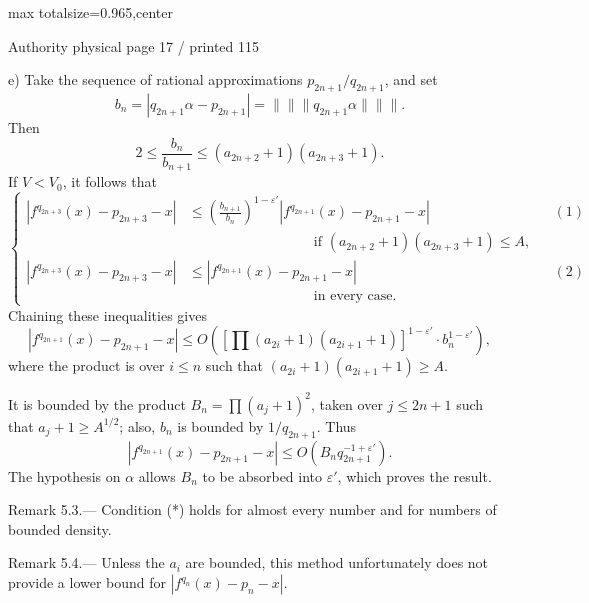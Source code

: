\documentclass{article}
\begin{document}
\newpage
\noindent\begin{adjustbox}{max totalsize={\textwidth}{0.965\textheight},center}\begin{minipage}{\textwidth}
\noindent\hfill\scriptsize Authority physical page 17 / printed 115\par\normalsize
e) Take the sequence of rational approximations \(p_{2n+1}/q_{2n+1}\), and set
\[
b_n=|q_{2n+1}\alpha-p_{2n+1}|=
\lVert\!\lVert\!\lVert q_{2n+1}\alpha\rVert\!\rVert\!\rVert.
\]
Then
\[
2\leq\frac{b_n}{b_{n+1}}\leq(a_{2n+2}+1)(a_{2n+3}+1).
\]
If \(V<V_0\), it follows that
\[
\left\{
\begin{aligned}
\left|f^{q_{2n+3}}(x)-p_{2n+3}-x\right|
&\leq\left(\frac{b_{n+1}}{b_n}\right)^{1-\varepsilon'}
\left|f^{q_{2n+1}}(x)-p_{2n+1}-x\right| && (1)\\[-1mm]
&\hspace{9em}\text{if }(a_{2n+2}+1)(a_{2n+3}+1)\leq A,\\[1mm]
\left|f^{q_{2n+3}}(x)-p_{2n+3}-x\right|
&\leq\left|f^{q_{2n+1}}(x)-p_{2n+1}-x\right| && (2)\\[-1mm]
&\hspace{9em}\text{in every case.}
\end{aligned}
\right.
\]
Chaining these inequalities gives
\[
\left|f^{q_{2n+1}}(x)-p_{2n+1}-x\right|
\leq O\!\left(
\left[\prod (a_{2i}+1)(a_{2i+1}+1)\right]^{1-\varepsilon'}
\cdot b_n^{1-\varepsilon'}\right),
\]
where the product is over \(i\leq n\) such that \((a_{2i}+1)(a_{2i+1}+1)\geq A\).

It is bounded by the product \(B_n=\prod(a_j+1)^2\), taken over \(j\leq2n+1\) such that \(a_j+1\geq A^{1/2}\); also, \(b_n\) is bounded by \(1/q_{2n+1}\). Thus
\[
\left|f^{q_{2n+1}}(x)-p_{2n+1}-x\right|
\leq O\!\left(B_nq_{2n+1}^{-1+\varepsilon'}\right).
\]
The hypothesis on \(\alpha\) allows \(B_n\) to be absorbed into \(\varepsilon'\), which proves the result.

Remark 5.3.— Condition (*) holds for almost every number and for numbers of bounded density.

Remark 5.4.— Unless the \(a_i\) are bounded, this method unfortunately does not provide a lower bound for \(\left|f^{q_n}(x)-p_n-x\right|\).
\end{minipage}\end{adjustbox}
\end{document}
